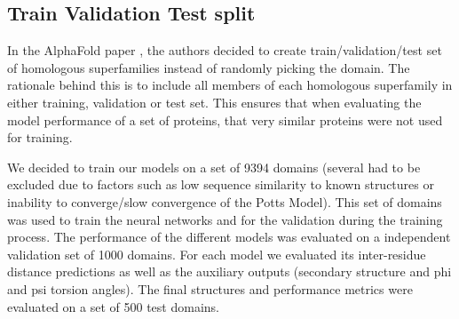     
    
\subsection{Train Validation Test split}
    
In the AlphaFold paper \cite{alphafold}, the authors decided to create train/validation/test set of homologous superfamilies instead of randomly picking the domain. 
The rationale behind this is to include all members of each homologous superfamily in either training, validation or test set. 
This ensures that when evaluating the model performance of a set of proteins, that very similar proteins were not used for training. 
    
We decided to train our models on a set of 9394 domains (several had to be excluded due to factors such as low sequence similarity to known structures or inability to converge/slow convergence of the Potts Model). This set of domains was used to train the neural networks and for the validation during the training process.
The performance of the different models was evaluated on a independent validation set of 1000 domains. For each model we evaluated its inter-residue distance predictions as well as the auxiliary outputs (secondary structure and phi and psi torsion angles).
The final structures and performance metrics were evaluated on a set of 500 test domains.
    
